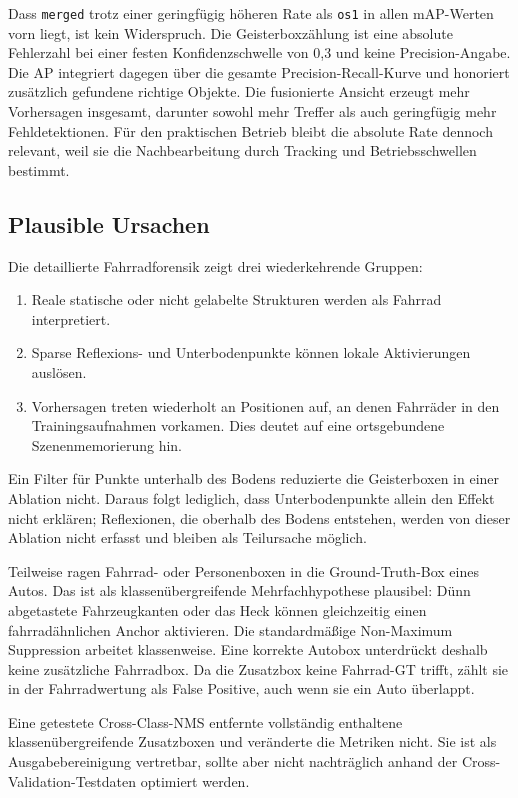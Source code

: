 Dass \texttt{merged} trotz einer geringfügig höheren Rate als \texttt{os1} in allen mAP-Werten vorn liegt, ist kein Widerspruch. Die Geisterboxzählung ist eine absolute Fehlerzahl bei einer festen Konfidenzschwelle von 0{,}3 und keine Precision-Angabe. Die AP integriert dagegen über die gesamte Precision-Recall-Kurve und honoriert zusätzlich gefundene richtige Objekte. Die fusionierte Ansicht erzeugt mehr Vorhersagen insgesamt, darunter sowohl mehr Treffer als auch geringfügig mehr Fehldetektionen. Für den praktischen Betrieb bleibt die absolute Rate dennoch relevant, weil sie die Nachbearbeitung durch Tracking und Betriebsschwellen bestimmt.

\subsection{Plausible Ursachen}
\label{sec:ursachen}

Die detaillierte Fahrradforensik zeigt drei wiederkehrende Gruppen:

\begin{enumerate}
    \item Reale statische oder nicht gelabelte Strukturen werden als Fahrrad interpretiert.
    \item Sparse Reflexions- und Unterbodenpunkte können lokale Aktivierungen auslösen.
    \item Vorhersagen treten wiederholt an Positionen auf, an denen Fahrräder in den Trainingsaufnahmen vorkamen. Dies deutet auf eine ortsgebundene Szenenmemorierung hin.
\end{enumerate}

Ein Filter für Punkte unterhalb des Bodens reduzierte die Geisterboxen in einer Ablation nicht. Daraus folgt lediglich, dass Unterbodenpunkte allein den Effekt nicht erklären; Reflexionen, die oberhalb des Bodens entstehen, werden von dieser Ablation nicht erfasst und bleiben als Teilursache möglich.

Teilweise ragen Fahrrad- oder Personenboxen in die Ground-Truth-Box eines Autos. Das ist als klassenübergreifende Mehrfachhypothese plausibel: Dünn abgetastete Fahrzeugkanten oder das Heck können gleichzeitig einen fahrradähnlichen Anchor aktivieren. Die standardmäßige Non-Maximum Suppression arbeitet klassenweise. Eine korrekte Autobox unterdrückt deshalb keine zusätzliche Fahrradbox. Da die Zusatzbox keine Fahrrad-GT trifft, zählt sie in der Fahrradwertung als False Positive, auch wenn sie ein Auto überlappt.

Eine getestete Cross-Class-NMS entfernte vollständig enthaltene klassenübergreifende Zusatzboxen und veränderte die Metriken nicht. Sie ist als Ausgabebereinigung vertretbar, sollte aber nicht nachträglich anhand der Cross-Validation-Testdaten optimiert werden.

